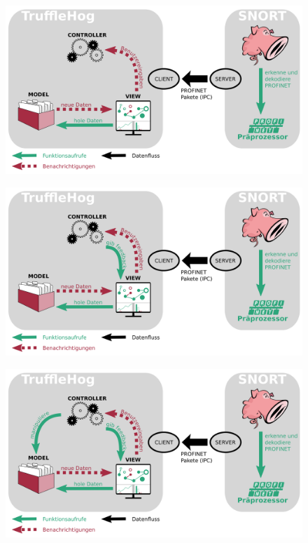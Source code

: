 \documentclass[18pt]{beamer}
\begin{document}
\begin{frame}
    \begin{figure}
    	\centering
    	\includegraphics[width=\textwidth]{./images/jan_10.png}
    \end{figure}
\end{frame}

\begin{frame}
    \begin{figure}
    	\centering
    	\includegraphics[width=\textwidth]{./images/jan_11.png}
    \end{figure}
\end{frame}

\begin{frame}
    \begin{figure}
    	\centering
    	\includegraphics[width=\textwidth]{./images/jan_12.png}
    \end{figure}
\end{frame}
\end{document}
